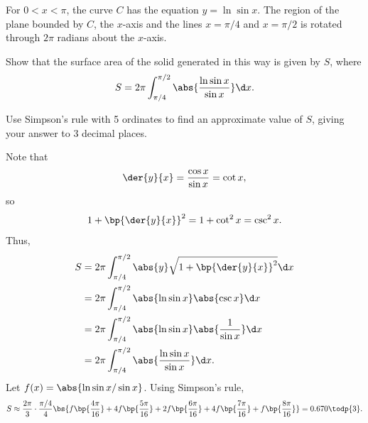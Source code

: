 \begin{problem}
    For $0 < x < \pi$, the curve $C$ has the equation $y = \ln \sin x$. The region of the plane bounded by $C$, the $x$-axis and the lines $x = \pi/4$ and $x = \pi/2$ is rotated through $2\pi$ radians about the $x$-axis.

    Show that the surface area of the solid generated in this way is given by $S$, where \[S = 2\pi \int_{\pi/4}^{\pi/2} \abs{\frac{\ln \sin x}{\sin x}} \d x.\]
    
    Use Simpson's rule with 5 ordinates to find an approximate value of $S$, giving your answer to 3 decimal places.
\end{problem}
\begin{solution}
    Note that \[\der{y}{x} = \frac{\cos x}{\sin x} = \cot x,\] so \[1 + \bp{\der{y}{x}}^2 = 1 + \cot^2 x = \csc^2 x.\] Thus,
        \begin{align*}
            S &= 2\pi \int_{\pi/4}^{\pi/2} \abs{y} \sqrt{1 + \bp{\der{y}{x}}^2} \d x\\
            &= 2\pi \int_{\pi/4}^{\pi/2} \abs{\ln \sin x} \abs{\csc x} \d x\\
            &= 2\pi \int_{\pi/4}^{\pi/2} \abs{\ln \sin x} \abs{\frac1{\sin x}} \d x\\
            &= 2\pi \int_{\pi/4}^{\pi/2} \abs{\frac{\ln \sin x}{\sin x}} \d x.
        \end{align*}
        Let $f(x) = \abs{\ln{\sin x}/\sin x}$. Using Simpson's rule, \[S \approx \frac{2\pi}3 \cdot \frac{\pi/4}{4} \bs{f\bp{\frac{4\pi}{16}} + 4f\bp{\frac{5\pi}{16}} + 2f\bp{\frac{6\pi}{16}} + 4f\bp{\frac{7\pi}{16}} + f\bp{\frac{8\pi}{16}}} = 0.670 \todp{3}.\]
\end{solution}

